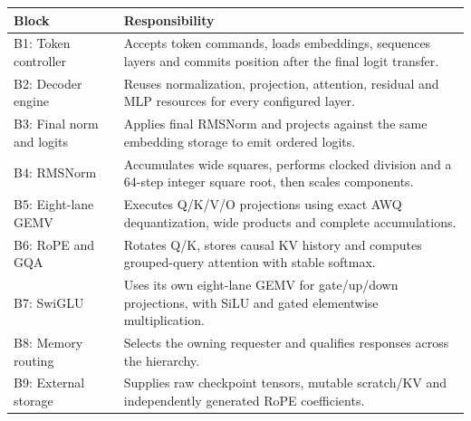 \documentclass[11pt,a4paper]{article}
\begin{document}
{\small\renewcommand{\arraystretch}{1.18}\begin{longtable}{@{}L{0.24\textwidth}|L{0.7\textwidth}@{}}\toprule

\textbf{Block} & \textbf{Responsibility}\\\midrule\endhead

B1: Token controller & Accepts token commands,\allowbreak{} loads embeddings,\allowbreak{} sequences layers and commits position after the final logit transfer.\\[2pt]\hline

B2: Decoder engine & Reuses normalization,\allowbreak{} projection,\allowbreak{} attention,\allowbreak{} residual and MLP resources for every configured layer.\\[2pt]\hline

B3: Final norm and logits & Applies final RMSNorm and projects against the same embedding storage to emit ordered logits.\\[2pt]\hline

B4: RMSNorm & Accumulates wide squares,\allowbreak{} performs clocked division and a 64-step integer square root,\allowbreak{} then scales components.\\[2pt]\hline

B5: Eight-lane GEMV & Executes Q/\allowbreak{}K/\allowbreak{}V/\allowbreak{}O projections using exact AWQ dequantization,\allowbreak{} wide products and complete accumulations.\\[2pt]\hline

B6: RoPE and GQA & Rotates Q/\allowbreak{}K,\allowbreak{} stores causal KV history and computes grouped-query attention with stable softmax.\\[2pt]\hline

B7: SwiGLU & Uses its own eight-lane GEMV for gate/\allowbreak{}up/\allowbreak{}down projections,\allowbreak{} with SiLU and gated elementwise multiplication.\\[2pt]\hline

B8: Memory routing & Selects the owning requester and qualifies responses across the hierarchy.\\[2pt]\hline

B9: External storage & Supplies raw checkpoint tensors,\allowbreak{} mutable scratch/\allowbreak{}KV and independently generated RoPE coefficients.\\[2pt]\hline

\bottomrule\end{longtable}}
\end{document}
